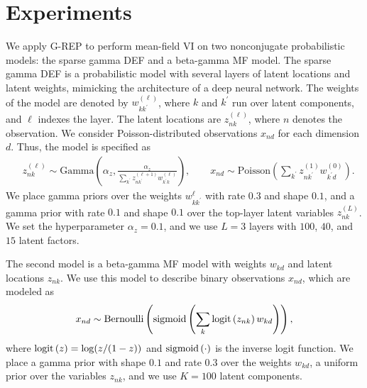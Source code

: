 \vspace*{-6pt}
\section{Experiments}
\vspace*{-5pt}
We apply \gls{G-REP} to perform mean-field \gls{VI} on two nonconjugate probabilistic models: the sparse gamma \gls{DEF} and a beta-gamma \gls{MF} model.
%
The sparse gamma \gls{DEF} \citep{Ranganath2015} is a probabilistic model with several layers of latent locations and latent weights, mimicking the architecture of a deep neural network. The weights of the model are denoted by $w_{k k^\prime}^{(\ell)}$, where $k$ and $k^\prime$ run over latent components, and $\ell$ indexes the layer. The latent locations are $z_{nk}^{(\ell)}$, where $n$ denotes the observation. We consider Poisson-distributed observations $x_{nd}$ for each dimension $d$. Thus, the model is specified as
\vspace*{-2pt}
\begin{align}
    & z_{nk}^{(\ell)} \sim \textrm{Gamma}\left(\alpha_z, \frac{\alpha_z}{\sum_{k^\prime} z_{nk^\prime}^{(\ell+1)} w_{k^\prime k}^{(\ell)}}\right),\qquad
    x_{nd} \sim \textrm{Poisson}\left(\sum_{k^\prime} z_{nk^\prime}^{(1)} w_{k^\prime d}^{(0)}\right).\nonumber
\end{align} \vspace*{-2pt}%
We place gamma priors over the weights $w_{k k^\prime}^{\ell}$ with rate $0.3$ and shape $0.1$, and a gamma prior with rate $0.1$ and shape $0.1$ over the top-layer latent variables $z_{nk}^{(L)}$. We set the hyperparameter $\alpha_z=0.1$, and we use $L=3$ layers with $100$, $40$, and $15$ latent factors.

The second model is a beta-gamma \gls{MF} model with weights $w_{kd}$ and latent locations $z_{nk}$. We use this model to describe binary observations $x_{nd}$, which are modeled as
\vspace*{-2pt}
\begin{equation}\nonumber
    x_{nd} \sim \textrm{Bernoulli}\left(\textrm{sigmoid}\left(\sum_{k} \textrm{logit}\left(z_{nk}\right) w_{kd}\right)\right),
\end{equation} \vspace*{-2pt}%
where $\textrm{logit}\left(z\right)=\log(z/(1-z))$ and $\textrm{sigmoid}\left(\cdot\right)$ is the inverse logit function. We place a gamma prior with shape $0.1$ and rate $0.3$ over the weights $w_{kd}$, a uniform prior over the variables $z_{nk}$, and we use $K=100$ latent components.

